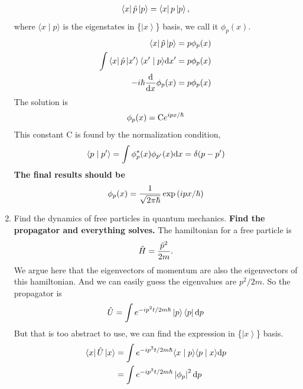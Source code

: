 \documentclass[letterpaper,10pt,english]{sphinxmanual}
\def\d{{\rm d}}
\newcommand{\bra}[1]{\left\langle #1\right|}
\newcommand{\ket}[1]{\left| #1\right\rangle}
\newcommand{\braket}[2]{\langle #1 \mid #2 \rangle}
\begin{document}
\begin{enumerate}
\begin{gather}
\begin{split}\bra{x}\hat p\ket{p} = \bra{x} p \ket{p} ,\end{split}\notag
\end{gather}
where \(\braket{x}{p}\) is the eigenstates in \{\(\ket{x}\)\} basis, we call it \(\phi_p(x)\).
\begin{gather}
\begin{split}\bra{x}\hat p\ket{p} & =  p \phi_p(x)    \\
\int \bra{x}\hat p \ket{x'}\braket{x'}{p}\d x' & =  p \phi_p(x)    \\
-i\hbar \frac{\d }{\d x} \phi_p(x) & =  p \phi_p(x)\end{split}\notag
\end{gather}
The solution is
\begin{gather}
\begin{split}\phi_p(x) = \mathrm{C} e^{i p x/\hbar}\end{split}\notag
\end{gather}
This constant C is found by the normalization condition,
\begin{gather}
\begin{split}\braket{p}{p'}=\int \phi_p^*(x)\phi_{p'}(x)\d x = \delta(p-p')\end{split}\notag
\end{gather}
\textbf{The final results should be}
\begin{gather}
\begin{split}\phi_p(x)=\frac{1}{\sqrt{2\pi \hbar}} \exp{(i p x/\hbar)}\end{split}\notag
\end{gather}
\item {} 
Find the dynamics of free particles in quantum mechanics.
\textbf{Find the propagator and everything solves.}
The hamiltonian for a free particle is
\begin{gather}
\begin{split}\hat H = \frac{\hat p^2}{2m} .\end{split}\notag
\end{gather}
We argue here that the eigenvectors of momentum are also the eigenvectors of this hamiltonian. And we can easily guess the eigenvalues are \(p^2/2m\). So the propagator is
\begin{gather}
\begin{split}\hat U = \int e^{-i p^2 t/2m\hbar} \ket{p}\bra{p} \d p\end{split}\notag
\end{gather}
But that is too abstract to use, we can find the expression in \{\(\ket{x}\)\} basis.
\begin{gather}
\begin{split}\bra{x}\hat U\ket{x} & =  \int e^{-i p^2 t/2 m \hbar} \braket{x}{p}\braket{p}{x} \d p    \\
& =  \int e^{-i p^2 t/2 m \hbar} \left| \phi_p \right|^2 \d p\end{split}\notag
\end{gather}
\end{enumerate}
\end{document}
